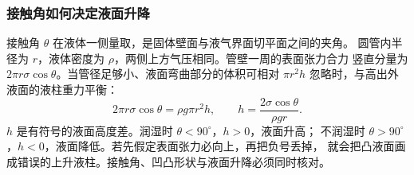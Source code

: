 \subsubsection*{接触角如何决定液面升降}

接触角 $\theta$ 在液体一侧量取，是固体壁面与液气界面切平面之间的夹角。
圆管内半径为 $r$，液体密度为 $\rho$，两侧上方气压相同。管壁一周的表面张力合力
竖直分量为 $2\pi r\sigma\cos\theta$。当管径足够小、液面弯曲部分的体积可相对
$\pi r^2h$ 忽略时，与高出外液面的液柱重力平衡：
\[
 2\pi r\sigma\cos\theta=\rho g\pi r^2h,
 \qquad h=\frac{2\sigma\cos\theta}{\rho gr}.
\]
$h$ 是有符号的液面高度差。润湿时 $\theta<90^\circ$，$h>0$，液面升高；
不润湿时 $\theta>90^\circ$，$h<0$，液面降低。若先假定表面张力必向上，再把负号丢掉，
就会把凸液面画成错误的上升液柱。接触角、凹凸形状与液面升降必须同时核对。
